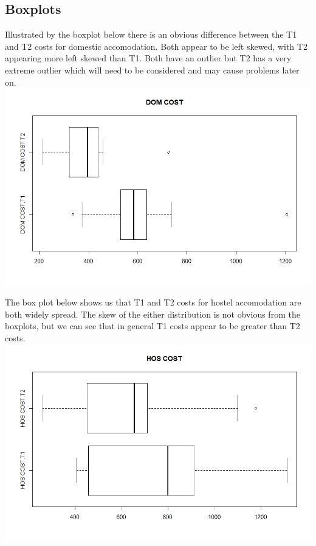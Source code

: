 \documentclass[]{article}
\begin{document}
\subsection{Boxplots}
Illustrated by the boxplot below there is an obvious difference between the T1 and T2 costs for domestic accomodation. Both appear to be left skewed, with T2 appearing more left skewed than T1. Both have an outlier but T2 has a very extreme outlier which will need to be considered and may cause problems later on.
\centering
\includegraphics[width=\textwidth]{RStudio/jpeg/Box_DOM.jpeg}
\raggedright
The box plot below shows us that T1 and T2 costs for hostel accomodation are both widely spread. The skew of the either distribution is not obvious from the boxplots, but we can see that in general T1 costs appear to be greater than T2 costs.
\centering
\includegraphics[width=\textwidth]{RStudio/jpeg/Box_HOS.jpeg}
\raggedright
\end{document}
